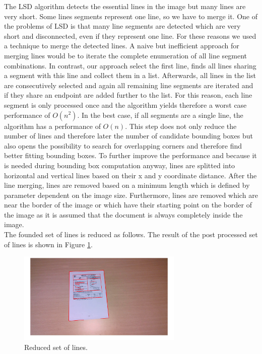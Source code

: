 \documentclass[english, paper=a4]{scrartcl}
\begin{document}
The LSD algorithm detects the essential lines in the image but many lines are very short. Some lines segments represent one line, so we have to merge it.
One of the problems of LSD is that many line segments are detected which are very short
and disconnected, even if they represent one line. For these reasons we
used a technique to merge the detected lines. A naive but inefficient approach
for merging lines would be to iterate the complete enumeration of all line
segment combinations. In contrast, our approach select the first line,
finds all lines sharing a segment with this line and collect them in a list.
Afterwards, all lines in the list are consecutively selected and again all remaining line segments are iterated and if they share an endpoint are added further to the list.
For this reason, each line segment is only processed once and the algorithm yields
therefore a worst case performance of $O(n^2)$. In the best case, if all segments
are a single line, the algorithm has a performance of  $O(n)$.
This step does not only reduce the number of lines and therefore later the number
of candidate bounding boxes but also opens the possibility to search for overlapping
corners and therefore find better fitting bounding boxes.
To further improve the performance and because it is needed during bounding box 
computation anyway, lines are splitted into horizontal and vertical lines based
on their x and y coordinate distance. 
After the line merging, lines are removed based on a minimum length which is 
defined by parameter dependent on the image size. Furthermore, lines are removed which are near the border of the image or which have their starting point on the border of the image as it is assumed that the document is always completely inside the image.\\
The founded set of lines is reduced as follows. 
The result of the post processed set of lines is shown in Figure \ref{fig:redLines}.

\begin{figure}[h]
\centering
\includegraphics[width=0.7\textwidth]{redLines.png}
\caption{Reduced set of lines.}
\label{fig:redLines}
\end{figure}
\end{document}
